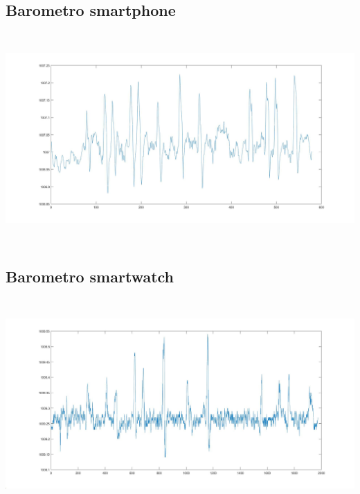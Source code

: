 \documentclass[a4paper, oneside]{book}
\begin{document}
\clearpage

\subsection{Barometro smartphone} 
\begin{minipage}{\linewidth}
\begin{center}
\includegraphics[width=160mm, height= 80mm]{./images/registrazione_tesi/pressure_phone.jpg} 
\end{center}
\end{minipage}
\makebox[\linewidth]{}
\makebox[\linewidth]{}\makebox[\linewidth]{}\makebox[\linewidth]{}
\makebox[\linewidth]{}\makebox[\linewidth]{}\makebox[\linewidth]{}
\makebox[\linewidth]{}\makebox[\linewidth]{}\makebox[\linewidth]{}
\makebox[\linewidth]{}\makebox[\linewidth]{}\makebox[\linewidth]{}

\subsection{Barometro smartwatch} 
\makebox[\linewidth]{}
\begin{minipage}{\linewidth}
\begin{center}
\includegraphics[width=160mm, height= 80mm]{./images/registrazione_tesi/pressure_watch.jpg} 
\end{center}
\end{minipage}
\end{document}
